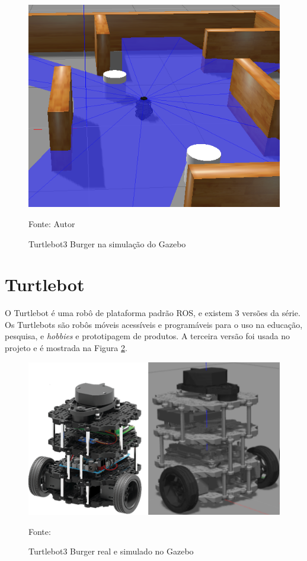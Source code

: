 \vspace{0.25cm}
\begin{figure}[H]
\caption{Turtlebot3 Burger na simulação do Gazebo}
\centerline{\includegraphics[width=\columnwidth]{imagens/gazebo.png}}
\small{Fonte: Autor}
\label{fig:gazebo}
\end{figure}

\section{Turtlebot}

O Turtlebot é uma robô de plataforma padrão ROS, e existem 3 versões da série.
Os Turtlebots são robôs móveis acessíveis e programáveis para o uso na educação, pesquisa, e \textit{hobbies} e prototipagem de produtos. A terceira versão foi usada no projeto e é mostrada na Figura \ref{fig:burger}.

\vspace{0.25cm}
\begin{figure}[H]
\caption{Turtlebot3 Burger real e simulado no Gazebo}
\centerline{\includegraphics[width=\columnwidth]{imagens/burger.png}}
\small{Fonte: \cite{robotisemanual}}
\label{fig:burger}
\end{figure}

